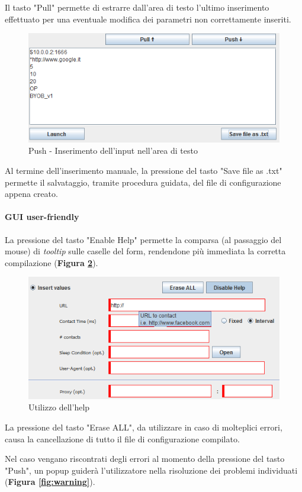 Il tasto "Pull" permette di estrarre dall'area di testo l'ultimo inserimento effettuato per una eventuale modifica dei parametri non correttamente inseriti.
\begin{figure}[!htb]
        \centering
		\includegraphics[width=0.6\linewidth]{./imgs/textarea}
        \caption{Push - Inserimento dell'input nell'area di testo}
        \label{fig:push}
        \vspace*{0.5cm}
\end{figure}

Al termine dell'inserimento manuale, la pressione del tasto "Save file as .txt" permette il salvataggio, tramite procedura guidata, del file di configurazione appena creato.

\paragraph{GUI user-friendly}
La pressione del tasto "Enable Help" permette la comparsa (al passaggio del mouse) di \textit{tooltip} sulle caselle del form, rendendone pi\`{u} immediata la corretta compilazione (\textbf{Figura \ref{fig:help}}).

\begin{figure}[!htb]
        \centering        
        \includegraphics[width=0.7\linewidth]{./imgs/help}
        \caption{Utilizzo dell'help}
        \label{fig:help}
\end{figure}

La pressione del tasto "Erase ALL", da utilizzare in caso di molteplici errori, causa la cancellazione di tutto il file di configurazione compilato.

Nel caso vengano riscontrati degli errori al momento della pressione del tasto "Push", un popup guider\`{a} l'utilizzatore nella risoluzione dei problemi individuati (\textbf{Figura \ref{fig:warning}}).

